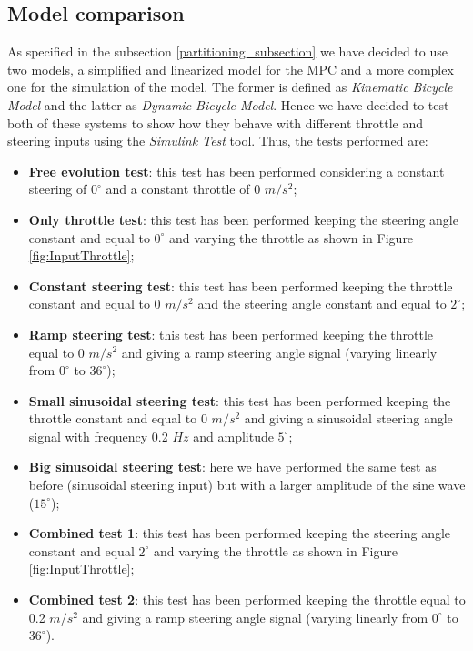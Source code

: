 \subsection{Model comparison}
As specified in the subsection \ref{partitioning_subsection} we have decided to use two models, a simplified and linearized model for the MPC and a more complex one for the simulation of the model. The former is defined as \textit{Kinematic Bicycle Model} and the latter as \textit{Dynamic Bicycle Model}.
Hence we have decided to test both of these systems to show how they behave with different throttle and steering inputs using the \textit{Simulink Test} tool. Thus, the tests performed are:
\begin{itemize}
    \item \textbf{Free evolution test}: this test has been performed considering a constant steering of $0^{\circ}$ and a constant throttle of 0 $m/s^2$;
    \item \textbf{Only throttle test}: this test has been performed keeping the steering angle constant and equal to $0^{\circ}$ and varying the throttle as shown in Figure \ref{fig:InputThrottle};
    \item \textbf{Constant steering test}: this test has been performed keeping the throttle constant and equal to 0 $m/s^2$ and the steering angle constant and equal to $2^{\circ}$;
    \item \textbf{Ramp steering test}: this test has been performed keeping the throttle equal to 0 $m/s^2$ and giving a ramp steering angle signal (varying linearly from $0^{\circ}$ to $36^{\circ}$);
    \item \textbf{Small sinusoidal steering test}: this test has been performed keeping the throttle constant and equal to 0 $m/s^2$ and giving a sinusoidal steering angle signal with frequency 0.2 $Hz$ and amplitude $5^{\circ}$;
    \item \textbf{Big sinusoidal steering test}: here we have performed the same test as before (sinusoidal steering input) but with a larger amplitude of the sine wave ($15^{\circ}$);
    \item \textbf{Combined test 1}: this test has been performed keeping the steering angle constant and equal $2^{\circ}$ and varying the throttle as shown in Figure \ref{fig:InputThrottle};
    \item \textbf{Combined test 2}: this test has been performed keeping the throttle equal to 0.2 $m/s^2$ and giving a ramp steering angle signal (varying linearly from $0^{\circ}$ to $36^{\circ}$).
\end{itemize}

